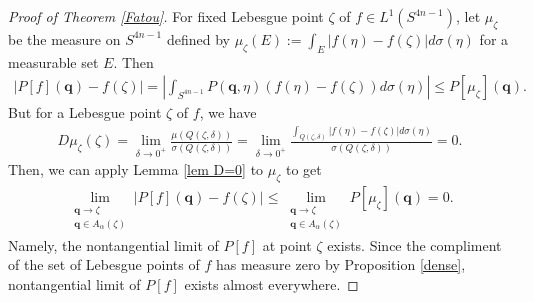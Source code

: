 \documentclass[a4paper,11pt]{amsart}
\numberwithin{equation}{section}
\begin{document}
\begin{proof}[Proof of Theorem \ref{Fatou}]
 For fixed Lebesgue point $\zeta$ of $f\in L^1(S^{4n-1})$, let $\mu_{\zeta}$ be the measure on $S^{4n-1}$ defined by $\mu_{\zeta}(E):=\int_{E}|f(\eta)-f(\zeta)|d\sigma(\eta)$ for a measurable set $E$. Then
\begin{equation*}\begin{aligned}
|P[f](\mathbf{q})-f(\zeta)|=\left|\int_{S^{4n-1}}P(\mathbf{q},\eta)(f(\eta)-f(\zeta))d\sigma(\eta)\right|\leq P[\mu_{\zeta}](\mathbf{q}).
\end{aligned}\end{equation*}
But for a Lebesgue point $\zeta$ of $f$, we have
\begin{equation*}\begin{aligned}
D\mu_{\zeta}(\zeta)=\lim_{\delta\rightarrow 0^+}\frac{\mu(Q(\zeta,\delta))}{\sigma(Q(\zeta,\delta))}=\lim_{\delta\rightarrow 0^+}\frac{\int_{Q(\zeta,\delta)}|f(\eta)-f(\zeta)|d\sigma(\eta)}{\sigma(Q(\zeta,\delta))}=0.
\end{aligned}\end{equation*}
Then, we can apply Lemma \ref{lem D=0} to $\mu_{\zeta}$ to get
\begin{equation*}\begin{aligned}
\lim_{\substack{\mathbf{q}\rightarrow\zeta\\ \mathbf{q}\in A_{\alpha}(\zeta)}} |P[f](\mathbf{q})-f(\zeta)|\leq \lim_{\substack{\mathbf{q}\rightarrow\zeta\\ \mathbf{q}\in A_{\alpha}(\zeta)}} P[\mu_{\zeta}](\mathbf{q})=0.
\end{aligned}\end{equation*}
Namely, the nontangential limit of $P[f]$ at point $\zeta$ exists. Since the compliment of the set of Lebesgue points of $f$ has measure zero by Proposition \ref{dense}, nontangential limit of $P[f]$ exists almost everywhere.
\end{proof}

\appendix
\end{document}
